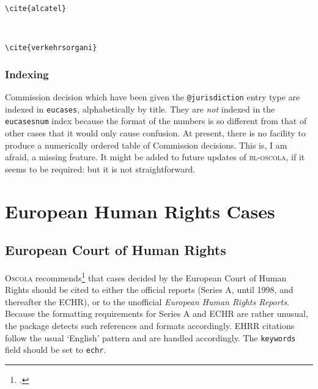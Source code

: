 \documentclass[a5paper,fontsize=9pt,DIV=1]{scrartcl}
\newcommand{\oscola}{\textsc{bl-oscola}}
\newcommand{\egcite}[1]{\texttt{\textbackslash cite#1}}
\begin{document}
\begin{description}
\item[\egcite{\{alcatel\}}] \cite{alcatel} \\
\item[\egcite{\{verkehrsorgani\}}] \cite{verkehrsorgani}
\end{description}



\subsubsection{Indexing}

Commission decision which have been given the \texttt{@jurisdiction}
entry type are indexed in \texttt{eucases}, alphabetically by
title. They are \emph{not} indexed in the \texttt{eucasesnum} index
because the format of the numbers is so different from that of other
cases that it would only cause confusion. At present, there is no
facility to produce a numerically ordered table of Commission
decisions. This is, I am afraid, a missing feature. It might be added
to future updates of \oscola, if it seems to be required: but it is
not straightforward.


\section{European Human Rights Cases}

\subsection{European Court of Human Rights}

\textsc{Oscola} recommends\footcite[31]{oscola} that cases decided by the
European Court of Human Rights should be cited to either the official
reports (Series A, until 1998, and thereafter the ECHR), or to the
unofficial \emph{European Human Rights Reports}. Because the
formatting requirements for Series A and ECHR are rather unusual, the
package detects such references and formats accordingly. EHRR
citations follow the usual `English' pattern and are handled
accordingly. The \texttt{keywords} field should be set to \texttt{echr}.
\end{document}

